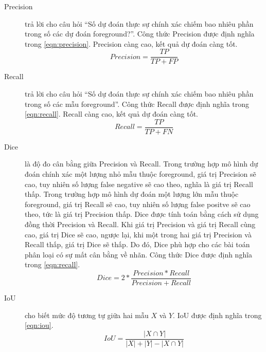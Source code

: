 	\begin{description}
		\item[Precision] trả lời cho câu hỏi ``Số dự đoán thực sự chính xác chiếm bao nhiêu phần trong số các dự đoán foreground?''. Công thức Precision được định nghĩa trong \autoref{eqn:precision}. Precision càng cao, kết quả dự đoán càng tốt.
		\begin{equation}
		Precision = \dfrac{TP}{TP + FP} \label{eqn:precision}
		\end{equation}
		
		\item[Recall] trả lời cho câu hỏi ``Số dự đoán thực sự chính xác chiếm bao nhiêu phần trong số các mẫu foreground''. Công thức Recall được định nghĩa trong \autoref{eqn:recall}. Recall càng cao, kết quả dự đoán càng tốt.
		\begin{equation}
		Recall = \dfrac{TP}{TP + FN} \label{eqn:recall}
		\end{equation}
		
		\item[Dice] là độ đo cân bằng giữa Precision và Recall. Trong trường hợp mô hình dự đoán chính xác một lượng nhỏ mẫu thuộc foreground, giá trị Precision sẽ cao, tuy nhiên số lượng false negative sẽ cao theo, nghĩa là giá trị Recall thấp. Trong trường hợp mô hình dự đoán một lượng lớn mẫu thuộc foreground, giá trị Recall sẽ cao, tuy nhiên số lượng false positve sẽ cao theo, tức là giá trị Precision thấp. Dice được tính toán bằng cách sử dụng đồng thời Precision và Recall. Khi giá trị Precision và giá trị Recall cùng cao, giá trị Dice sẽ cao, ngược lại, khi một trong hai giá trị Precision và Recall thấp, giá trị Dice sẽ thấp. Do đó, Dice phù hợp cho các bài toán phân loại có sự mất cân bằng về nhãn. Công thức Dice được định nghĩa trong \autoref{eqn:recall}.
		\begin{equation}
		Dice = 2 * \dfrac{Precision * Recall}{Precision + Recall}
		\end{equation}
		\item[IoU] cho biết mức độ tương tự giữa hai mẫu $X$ và $Y$. IoU được định nghĩa trong \autoref{eqn:iou}.
		\begin{equation}
		IoU = \dfrac{|X \cap Y|}{|X| + |Y| - |X \cap Y|} \label{eqn:iou}
		\end{equation}
	\end{description}

	
\newpage
